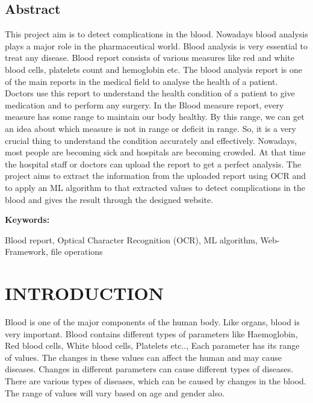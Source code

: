 \documentclass[twocolumn]{article}
\begin{document}
\twocolumn
\begin{center}
\section*{Abstract}
\end{center}
This project aim is to detect complications in the blood. Nowadays blood analysis plays a major role in the pharmaceutical world. Blood analysis is very essential to treat any disease. Blood report consists of various measures like red and white blood cells, platelets count and hemoglobin etc. The blood analysis report is one of the main reports in the medical field to analyse the health of a patient. Doctors use this report to understand the health condition of a patient to give medication and to perform any surgery. In the Blood measure report, every measure has some range to maintain our body healthy. By this range, we can get an idea about which measure is not in range or deficit in range. So, it is a very crucial thing to understand the condition accurately and effectively. Nowadays, most people are becoming sick and hospitals are becoming crowded. At that time the hospital staff or doctors can upload the report to get a perfect analysis. The project aims to extract the information from the uploaded report using OCR and to apply an ML algorithm to that extracted values to detect complications in the blood and gives the result through the designed website. \cite{Allison1996}\\

\begin{flushleft}
\textbf{{\large Keywords:}\\}
\end{flushleft}
 Blood report, Optical Character Recognition (OCR), ML algorithm, Web-Framework, file operations\\

\section{INTRODUCTION}
Blood is one of the major components of the human body. Like organs, blood is very important. Blood contains different types of parameters like Haemoglobin, Red blood cells, White blood cells, Platelets etc.., Each parameter has its range of values. The changes in these values can affect the  human and may cause diseases. Changes in different parameters can cause different types of diseases. There are various types of diseases, which can be caused by changes in the blood. The range of values will vary based on age and gender also.
\end{document}
